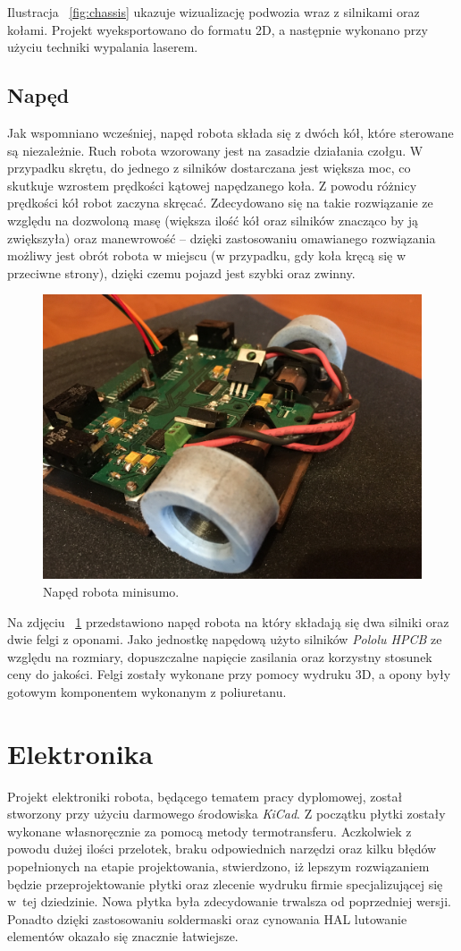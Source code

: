 Ilustracja ~\ref{fig:chassis} ukazuje wizualizację podwozia wraz z silnikami oraz kołami. Projekt wyeksportowano do formatu 2D, a następnie wykonano przy użyciu techniki wypalania laserem. 

\subsection{Napęd}
Jak wspomniano wcześniej, napęd robota składa się z dwóch kół, które sterowane są niezależnie. Ruch robota wzorowany jest na zasadzie działania czołgu. W przypadku skrętu, do jednego z silników dostarczana jest większa moc, co skutkuje wzrostem prędkości kątowej napędzanego koła. Z powodu różnicy prędkości kół robot zaczyna skręcać. Zdecydowano się na takie rozwiązanie ze względu na dozwoloną masę (większa ilość kół oraz silników znacząco by ją zwiększyła) oraz manewrowość – dzięki zastosowaniu omawianego rozwiązania możliwy jest obrót robota w miejscu (w przypadku, gdy koła kręcą się w przeciwne strony), dzięki czemu pojazd jest szybki oraz zwinny. 

\begin{figure}[H]
	\centering
		\includegraphics[width=0.75\linewidth]{pic04/drive.JPG}
	\caption{Napęd robota minisumo.}
	\label{fig:drive}	
\end{figure}

Na zdjęciu ~\ref{fig:drive} przedstawiono napęd robota na który składają się dwa silniki oraz dwie felgi z oponami. Jako jednostkę napędową użyto silników \textit{Pololu HPCB} ze względu  na rozmiary, dopuszczalne napięcie zasilania oraz korzystny stosunek ceny do jakości. Felgi zostały wykonane przy pomocy wydruku 3D, a opony były gotowym komponentem wykonanym z poliuretanu.

\section{Elektronika}
Projekt elektroniki robota, będącego tematem pracy dyplomowej, został stworzony przy użyciu darmowego środowiska \textit{KiCad}. Z początku płytki zostały wykonane własnoręcznie za pomocą metody termotransferu. Aczkolwiek z powodu dużej ilości przelotek, braku odpowiednich narzędzi oraz kilku błędów popełnionych na etapie projektowania, stwierdzono, iż lepszym rozwiązaniem będzie przeprojektowanie płytki oraz zlecenie wydruku firmie specjalizującej się w~tej dziedzinie. Nowa płytka była zdecydowanie trwalsza od poprzedniej wersji. Ponadto dzięki zastosowaniu soldermaski oraz cynowania HAL lutowanie elementów okazało się znacznie łatwiejsze.  

